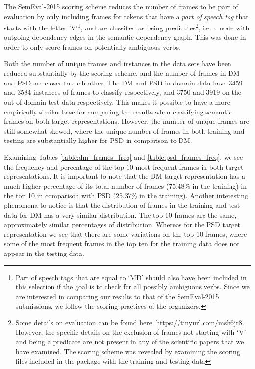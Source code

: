The SemEval-2015 scoring scheme reduces the number of frames to be part of evaluation by only including frames for tokens that have a \textit{part of speech tag} that starts with the letter 'V'\footnote{Part of speech tags that are equal to `MD' should also have been included in this selection if the goal is to check for all possibly ambiguous verbs. Since we are interested in comparing our results to that of the SemEval-2015 submissions, we follow the scoring practices of the organizers.}, and are classified as being predicates\footnote{Some details on evaluation can be found here: \url{https://tinyurl.com/msh6jr8}. However, the specific details on the exclusion of frames not starting with `V' and being a predicate are not present in any of the scientific papers that we have examined. The scoring scheme was revealed by examining the scoring files included in the package with the training and testing data}, i.e. a node with outgoing dependency edges in the semantic dependency graph. This was done in order to only score frames on potentially ambiguous verbs.

Both the number of unique frames and instances in the data sets have been reduced substantially by the scoring scheme, and the number of frames in DM and PSD are closer to each other. The DM and PSD in-domain data have 3459 and 3584 instances of frames to classify respectively, and 3750 and 3919 on the out-of-domain test data respectively. This makes it possible to have a more empirically similar base for comparing the results when classifying semantic frames on both target representations. However, the number of unique frames are still somewhat skewed, where the unique number of frames in both training and testing are substantially higher for PSD in comparison to DM.

Examining Tables \ref{table:dm_frames_freq} and \ref{table:psd_frames_freq}, we see the frequency and percentage of the top 10 most frequent frames in both target representations. It is important to note that the DM target representation has a much higher percentage of its total number of frames (75.48\% in the training) in the top 10 in comparison with PSD (25.37\% in the training). Another interesting phenomena to notice is that the distribution of frames in the training and test data for DM has a very similar distribution. The top 10 frames are the same, approximately similar percentages of distribution. Whereas for the PSD target representation we see that there are some variations on the top 10 frames, where some of the most frequent frames in the top ten for the training data does not appear in the testing data.









